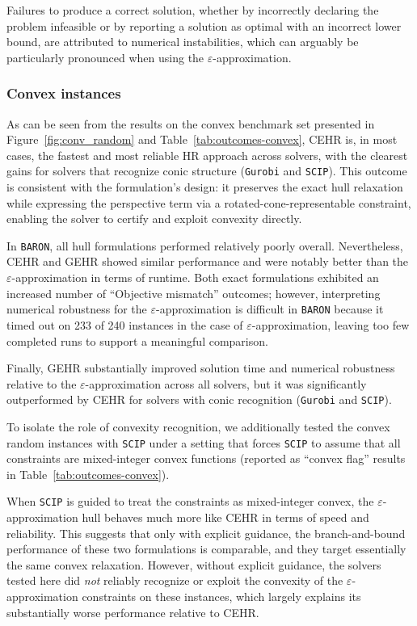 \documentclass[11pt]{article}
\begin{document}
Failures to produce a correct solution, whether by incorrectly declaring the problem infeasible or by reporting a solution as optimal with an incorrect lower bound, are attributed to numerical instabilities, which can arguably be particularly pronounced when using the  \(\varepsilon\)-approximation.


\subsubsection{Convex instances}


As can be seen from the results on the convex benchmark set presented in Figure~\ref{fig:conv_random} and Table~\ref{tab:outcomes-convex}, CEHR is, in most cases, the fastest and most reliable HR approach across solvers, with the clearest gains for solvers that recognize conic structure (\texttt{Gurobi} and \texttt{SCIP}).
This outcome is consistent with the formulation's design: it preserves the exact hull relaxation while expressing the perspective term via a rotated-cone-representable constraint, enabling the solver to certify and exploit convexity directly.

In \texttt{BARON}, all hull formulations performed relatively poorly overall. Nevertheless, CEHR and GEHR showed similar performance and were notably better than the \(\varepsilon\)-approximation in terms of runtime.
Both exact formulations exhibited an increased number of ``Objective mismatch'' outcomes; however, interpreting numerical robustness for the \(\varepsilon\)-approximation is difficult in \texttt{BARON} because it timed out on 233 of 240 instances in the case of $\varepsilon$-approximation, leaving too few completed runs to support a meaningful comparison.

Finally, GEHR substantially improved solution time and numerical robustness relative to the \(\varepsilon\)-approximation across all solvers, but it was significantly outperformed by CEHR for solvers with conic recognition (\texttt{Gurobi} and \texttt{SCIP}).






To isolate the role of convexity recognition, we additionally tested the convex random instances with \texttt{SCIP} under a setting that forces \texttt{SCIP} to assume that all constraints are mixed-integer convex functions (reported as ``convex flag'' results in Table~\ref{tab:outcomes-convex}). 



When \texttt{SCIP} is guided to treat the constraints as mixed-integer convex, the $\varepsilon$-approximation hull behaves much more like CEHR in terms of speed and reliability.
This suggests that only with explicit guidance, the branch-and-bound performance of these two formulations is comparable, and they target essentially the same convex relaxation.
However, without explicit guidance, the solvers tested here did \emph{not} reliably recognize or exploit the convexity of the $\varepsilon$-approximation constraints on these instances, which largely explains its substantially worse performance relative to CEHR.
\end{document}
